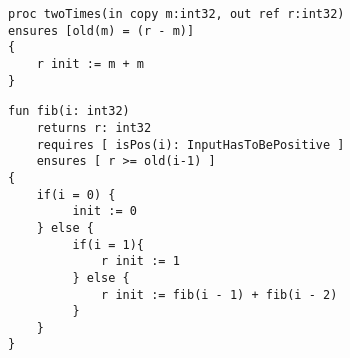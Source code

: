 \begin{lstlisting}[caption=Pre-/postconditions mit old Funktion]
proc twoTimes(in copy m:int32, out ref r:int32)
ensures [old(m) = (r - m)]
{
    r init := m + m
}
\end{lstlisting}

\begin{lstlisting}[caption=Pre-/postconditions mit old Funktion]
fun fib(i: int32)
    returns r: int32
    requires [ isPos(i): InputHasToBePositive ]
    ensures [ r >= old(i-1) ]
{
    if(i = 0) {
         init := 0
    } else {
         if(i = 1){
             r init := 1
         } else {
             r init := fib(i - 1) + fib(i - 2)
         }
    }
}
\end{lstlisting}
